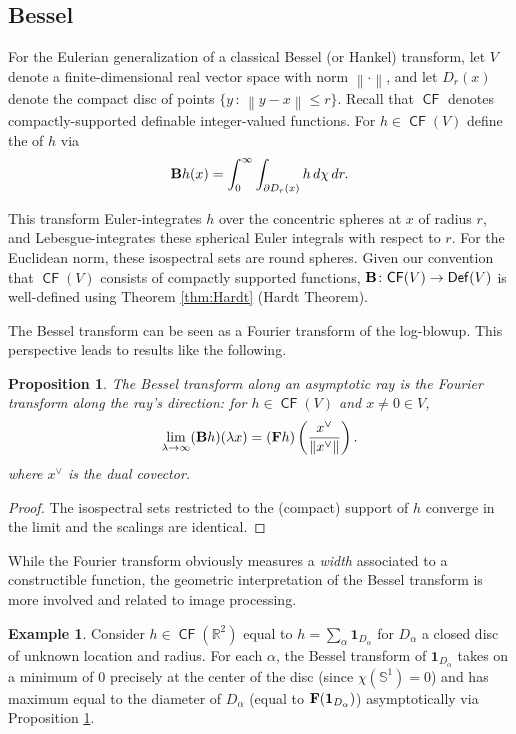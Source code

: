 \documentclass{psapm-l}
\newtheorem{proposition}[theorem]{Proposition}
\theoremstyle{definition}
\newtheorem{example}[theorem]{Example}
\theoremstyle{remark}
\numberwithin{equation}{section}
\begin{document}
\subsection{Bessel}
\label{sec:bessel}
For the Eulerian generalization of a classical Bessel (or Hankel) transform, let $V$ denote a finite-dimensional real vector space with norm ${\left\|{{\cdot}}\right\|}$, and let $D_r(x)$ denote the compact disc of points $\{y \, : \, {\left\|{{y-x}}\right\|}\leq r\}$. Recall that ${{{\operatorname{\mathsf{{CF}}}}}}$ denotes compactly-supported definable integer-valued functions. For $h\in {{{\operatorname{\mathsf{{CF}}}}}}(V)$ define the {{}} of $h$ via
\begin{equation}
    {{\bf B}} h(x) = \int_0^\infty\int_{\partial D_r(x)}h\,d\chi\,dr .
\end{equation}

This transform Euler-integrates $h$ over the concentric spheres at $x$ of radius $r$, and Lebesgue-integrates these spherical Euler integrals with respect to $r$. For the Euclidean norm, these isospectral sets are round spheres. Given our convention that ${{{\operatorname{\mathsf{{CF}}}}}}(V)$ consists of compactly supported functions, ${{\bf B}}\colon{{{\operatorname{\mathsf{{CF}}}}}}(V)\to{{{\operatorname{\mathsf{{Def}}}}}}(V)$ is well-defined using Theorem \ref{thm:Hardt} (Hardt Theorem).

The Bessel transform can be seen as a Fourier transform of the log-blowup. This perspective leads to results like the following.

\begin{proposition}
\label{prop:fourierbessel}
The Bessel transform along an asymptotic ray is the Fourier transform along the ray's direction: for $h\in{{{\operatorname{\mathsf{{CF}}}}}}(V)$ and $x\neq 0\in V$,
\begin{equation}
    \lim_{\lambda\to\infty}({{\bf B}} h)(\lambda x) = ({{\bf F}} h)\left(\frac{x^\vee}{{\left\|{{x^\vee}}\right\|}}\right) .
\end{equation}
where $x^\vee$ is the dual covector.
\end{proposition}
\begin{proof}
The isospectral sets restricted to the (compact) support of $h$ converge in the limit and the scalings are identical.
\end{proof}

While the Fourier transform obviously measures a {\em width} associated to a constructible function, the geometric interpretation of the Bessel transform is more involved and related to image processing.
\begin{example}
Consider $h\in{{{\operatorname{\mathsf{{CF}}}}}}({{\mathbb R}}^2)$ equal to $h=\sum_\alpha{{\mathbf{1}}}_{D_\alpha}$ for $D_\alpha$ a closed disc of unknown location and radius. For each $\alpha$, the Bessel transform of ${{\mathbf{1}}}_{D_\alpha}$ takes on a minimum of $0$ precisely at the center of the disc (since $\chi({{\mathbb S}}^1)=0$) and has maximum equal to the diameter of $D_\alpha$ (equal to ${{\bf F}}({{\mathbf{1}}}_{D_\alpha})$) asymptotically via Proposition \ref{prop:fourierbessel}.
\end{example}
\end{document}
